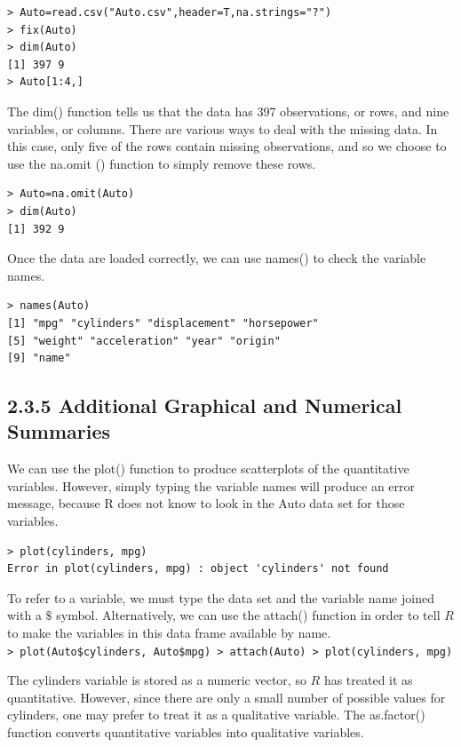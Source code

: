 \documentclass[10pt]{article}
\begin{document}
\begin{verbatim}
> Auto=read.csv("Auto.csv",header=T,na.strings="?")
> fix(Auto)
> dim(Auto)
[1] 397 9
> Auto[1:4,]
\end{verbatim}

The dim() function tells us that the data has 397 observations, or rows, and nine variables, or columns. There are various ways to deal with the missing data. In this case, only five of the rows contain missing observations, and so we choose to use the na.omit () function to simply remove these rows.

\begin{verbatim}
> Auto=na.omit(Auto)
> dim(Auto)
[1] 392 9
\end{verbatim}

Once the data are loaded correctly, we can use names() to check the variable names.

\begin{verbatim}
> names(Auto)
[1] "mpg" "cylinders" "displacement" "horsepower"
[5] "weight" "acceleration" "year" "origin"
[9] "name"
\end{verbatim}

\subsection*{2.3.5 Additional Graphical and Numerical Summaries}
We can use the plot() function to produce scatterplots of the quantitative variables. However, simply typing the variable names will produce an error message, because R does not know to look in the Auto data set for those variables.

\begin{verbatim}
> plot(cylinders, mpg)
Error in plot(cylinders, mpg) : object 'cylinders' not found
\end{verbatim}

To refer to a variable, we must type the data set and the variable name joined with a $\$$ symbol. Alternatively, we can use the attach() function in order to tell $R$ to make the variables in this data frame available by name.\\
\texttt{> plot(Auto\$cylinders, Auto\$mpg) > attach(Auto) > plot(cylinders, mpg)}

The cylinders variable is stored as a numeric vector, so $R$ has treated it as quantitative. However, since there are only a small number of possible values for cylinders, one may prefer to treat it as a qualitative variable. The as.factor() function converts quantitative variables into qualitative variables.
\end{document}
